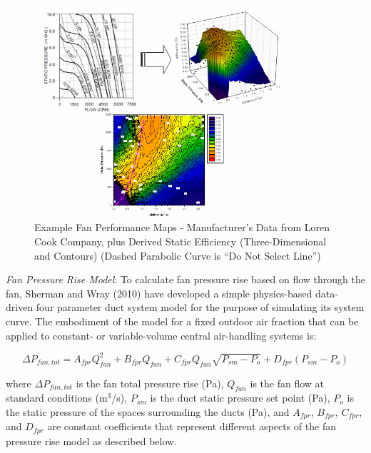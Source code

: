 \begin{figure}[hbtp] %
\centering
\includegraphics[width=0.9\textwidth, height=0.9\textheight, keepaspectratio=true]{media/image4888.png}
\caption{Example Fan Performance Maps - Manufacturer’s Data from Loren Cook Company, plus Derived Static Efficiency (Three-Dimensional and Contours) (Dashed Parabolic Curve is “Do Not Select Line”) \protect \label{fig:example-fan-performance-maps-manufacturers}}
\end{figure}

\emph{Fan Pressure Rise Model}: To calculate fan pressure rise based on flow through the fan, Sherman and Wray (2010) have developed a simple physics-based data-driven four parameter duct system model for the purpose of simulating its system curve. The embodiment of the model for a fixed outdoor air fraction that can be applied to constant- or variable-volume central air-handling systems is:

\begin{equation}
\Delta {P_{fan,tot}} = {A_{fpr}}Q_{fan}^2 + {B_{fpr}}Q_{fan}^{} + {C_{fpr}}Q_{fan}^{}\sqrt {{P_{sm}} - {P_o}} + {D_{fpr}}\left( {{P_{sm}} - {P_o}} \right)
\label{eq:DeltaPfantot531}
\end{equation}

where \(\Delta P_{fan,tot}\) is the fan total pressure rise (Pa), \(Q_{fan}\) is the fan flow at standard conditions (m\(^{3}\)/s), \(P_{sm}\) is the duct static pressure set point (Pa), \(P_{o}\) is the static pressure of the spaces surrounding the ducts (Pa), and \(A_{fpr}\), \(B_{fpr}\), \(C_{fpr}\), and \(D_{fpr}\) are constant coefficients that represent different aspects of the fan pressure rise model as described below.

